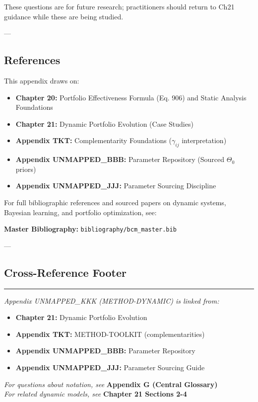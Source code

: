 These questions are for future research; practitioners should return to Ch21 guidance while these are being studied.

---


\subsection*{References}

This appendix draws on:
\begin{itemize}[nosep]
\item \textbf{Chapter 20:} Portfolio Effectiveness Formula (Eq. 906) and Static Analysis Foundations
\item \textbf{Chapter 21:} Dynamic Portfolio Evolution (Case Studies)
\item \textbf{Appendix TKT:} Complementarity Foundations ($\gamma_{ij}$ interpretation)
\item \textbf{Appendix UNMAPPED_BBB:} Parameter Repository (Sourced $\Theta_0$ priors)
\item \textbf{Appendix UNMAPPED_JJJ:} Parameter Sourcing Discipline
\end{itemize}

For full bibliographic references and sourced papers on dynamic systems, Bayesian learning, and portfolio optimization, see:

\vspace{0.3cm}
\textbf{Master Bibliography:} \texttt{bibliography/bcm\_master.bib}

\nocite{bcm_master}

---

\subsection*{Cross-Reference Footer}

\begin{center}
\rule{0.8\textwidth}{0.5pt}

\textit{Appendix UNMAPPED_KKK (METHOD-DYNAMIC) is linked from:}
\begin{itemize}[nosep]
\item \textbf{Chapter 21:} Dynamic Portfolio Evolution
\item \textbf{Appendix TKT:} METHOD-TOOLKIT (complementarities)
\item \textbf{Appendix UNMAPPED_BBB:} Parameter Repository
\item \textbf{Appendix UNMAPPED_JJJ:} Parameter Sourcing Guide
\end{itemize}

\vspace{0.2cm}

\textit{For questions about notation, see} \textbf{Appendix G (Central Glossary)} \\
\textit{For related dynamic models, see} \textbf{Chapter 21 Sections 2-4}

\end{center}

